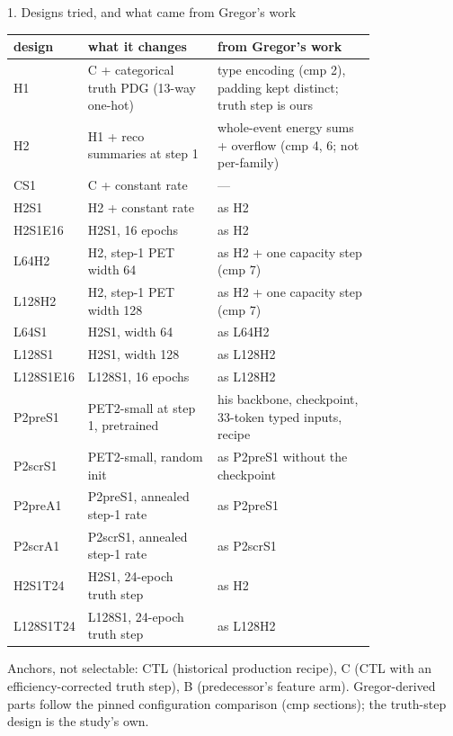 \documentclass[aspectratio=169,10pt]{beamer}
\def\evidencetext{}
\begin{document}
\gdef\evidencetext{\texttt{DEVELOPMENT-20260926.md}; \texttt{nd-unfolding/pet/configuration\_comparison/CONFIGURATION\_COMPARISON-20260918.md (Gregor's minerva-ml pinned at fc9a099; sections cited as cmp)}}
\begin{frame}{1. Designs tried, and what came from Gregor's work}
{\scriptsize
\begin{tabular}{l>{\raggedright\arraybackslash}p{0.36\linewidth}>{\raggedright\arraybackslash}p{0.44\linewidth}}
\toprule
design & what it changes & from Gregor's work \\
\midrule
H1 & C + categorical truth PDG (13-way one-hot) & type encoding (cmp 2), padding kept distinct; truth step is ours \\
H2 & H1 + reco summaries at step 1 & whole-event energy sums + overflow (cmp 4, 6; not per-family) \\
CS1 & C + constant rate & --- \\
H2S1 & H2 + constant rate & as H2 \\
H2S1E16 & H2S1, 16 epochs & as H2 \\
L64H2 & H2, step-1 PET width 64 & as H2 + one capacity step (cmp 7) \\
L128H2 & H2, step-1 PET width 128 & as H2 + one capacity step (cmp 7) \\
L64S1 & H2S1, width 64 & as L64H2 \\
L128S1 & H2S1, width 128 & as L128H2 \\
L128S1E16 & L128S1, 16 epochs & as L128H2 \\
P2preS1 & PET2-small at step 1, pretrained & his backbone, checkpoint, 33-token typed inputs, recipe \\
P2scrS1 & PET2-small, random init & as P2preS1 without the checkpoint \\
P2preA1 & P2preS1, annealed step-1 rate & as P2preS1 \\
P2scrA1 & P2scrS1, annealed step-1 rate & as P2scrS1 \\
H2S1T24 & H2S1, 24-epoch truth step & as H2 \\
L128S1T24 & L128S1, 24-epoch truth step & as L128H2 \\
\bottomrule
\end{tabular}}\par\vspace{0.1cm}\tiny Anchors, not selectable: CTL (historical production recipe), C (CTL with an efficiency-corrected truth step), B (predecessor's feature arm). Gregor-derived parts follow the pinned configuration comparison (cmp sections); the truth-step design is the study's own.
\end{frame}
\end{document}
